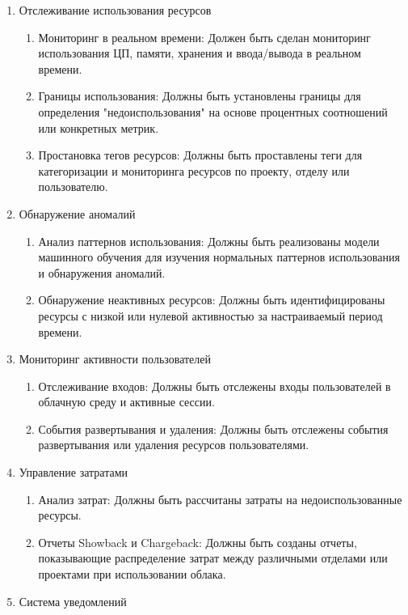 \documentclass[14pt, a4paper]{extarticle}
\begin{document}
\begin{enumerate}
    \item Отслеживание использования ресурсов
    \begin{enumerate}
        \item Мониторинг в реальном времени: Должен быть сделан мониторинг использования ЦП, памяти, хранения и ввода/вывода в реальном времени.
        \item Границы использования: Должны быть установлены границы для определения "недоиспользования" на основе процентных соотношений или конкретных метрик.
        \item Простановка тегов ресурсов: Должны быть проставлены теги для категоризации и мониторинга ресурсов по проекту, отделу или пользователю.
    \end{enumerate}
    \item Обнаружение аномалий
    \begin{enumerate}
        \item Анализ паттернов использования: Должны быть реализованы модели машинного обучения для изучения нормальных паттернов использования и обнаружения аномалий.
        \item Обнаружение неактивных ресурсов: Должны быть идентифицированы ресурсы с низкой или нулевой активностью за настраиваемый период времени.
    \end{enumerate}
    \item Мониторинг активности пользователей
    \begin{enumerate}
        \item Отслеживание входов: Должны быть отслежены входы пользователей в облачную среду и активные сессии.
        \item События развертывания и удаления: Должны быть отслежены события развертывания или удаления ресурсов пользователями.
    \end{enumerate}
    \item Управление затратами
    \begin{enumerate}
        \item Анализ затрат: Должны быть рассчитаны затраты на недоиспользованные ресурсы.
        \item Отчеты Showback и Chargeback: Должны быть созданы отчеты, показывающие распределение затрат между различными отделами или проектами при использовании облака.
    \end{enumerate}
    \item Система уведомлений
    \begin{enumerate}

\end{enumerate}
\end{enumerate}
\end{document}
